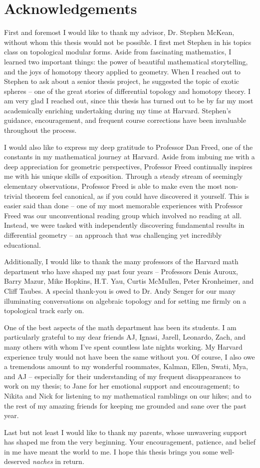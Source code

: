 \chapter*{Acknowledgements}

First and foremost I would like to thank my advisor, Dr. Stephen McKean, without whom this thesis would not be possible. I first met Stephen in his topics class on topological modular forms. Aside from fascinating mathematics, I learned two important things: the power of beautiful mathematical storytelling, and the joys of homotopy theory applied to geometry. 
When I reached out to Stephen to ask about a senior thesis project, he suggested the topic of exotic spheres -- one of the great stories of differential topology and homotopy theory. I am very glad I reached out, since this thesis has turned out to be by far my most academically enriching undertaking during my time at Harvard. Stephen's guidance, encouragement, and frequent course corrections have been invaluable throughout the process.

I would also like to express my deep gratitude to Professor Dan Freed, one of the constants in my mathematical journey at Harvard.
Aside from imbuing me with a deep appreciation for geometric perspectives, Professor Freed continually inspires me with his unique skills of exposition. Through a steady stream of seemingly elementary observations, Professor Freed is able to make even the most non-trivial theorem feel canonical, as if you could have discovered it yourself.
This is easier said than done -- one of my most memorable experiences with Professor Freed was our unconventional reading group which involved no reading at all. Instead, we were tasked with independently discovering fundamental results in differential geometry -- an approach that was challenging yet incredibly educational.

Additionally, I would like to thank the many professors of the Harvard math department who have shaped my past four years -- 
Professors Denis Auroux, Barry Mazur, Mike Hopkins, H.T. Yau, Curtis McMullen, Peter Kronheimer, and Cliff Taubes. A special thank-you is owed to Dr. Andy Senger for our many illuminating conversations on algebraic topology and for setting me firmly on a  topological track early on. 

One of the best aspects of the math department has been its students. I am particularly  grateful to my dear friends AJ, Ignasi, Jarell, Leonardo, Zach, and many others with whom I've spent countless late nights working. My Harvard experience truly would not have been the same without you.
Of course, I also owe a tremendous amount to my wonderful roommates, Kalman, Ellen, Swati, Mya, and AJ -- especially for their understanding of my frequent disappearances to work on my thesis; to Jane for her emotional support and encouragement; to Nikita and Nick for listening to my mathematical ramblings on our hikes; and to the rest of my amazing friends for keeping me grounded and sane over the past year. 

Last but not least I would like to thank my parents, whose unwavering support has shaped me from the very beginning. Your encouragement, patience, and belief in me have meant the world to me. I hope this thesis brings you some well-deserved \emph{naches} in return.
